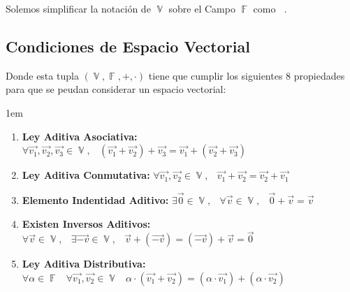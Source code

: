\documentclass[12pt, fleqn]{report}                             %
\newenvironment{SmallIndentation}[1][0.75em]                    %
        {\begin{adjustwidth}{#1}{}\begin{footnotesize}}             %
        {\end{footnotesize}\end{adjustwidth}}                       %
\DeclareMathOperator \Space {\quad}                             %
\DeclareMathOperator \MiniSpace {\;}                            %
\theoremstyle{break}                                            %
\DeclareMathOperator \GenericField {\mathbb{F}}                 %
\DeclareMathOperator \VectorSet    {\mathbb{V}}                 %
\DeclareMathOperator \VectorSpace  {\VectorSet_{\GenericField}} %
\begin{document}
            Solemos simplificar la notación de $\VectorSet$ sobre el Campo $\GenericField$ como $\VectorSpace$.


            \subsection{Condiciones de Espacio Vectorial}

                Donde esta tupla $(\VectorSet, \GenericField, +, \cdot)$ tiene que cumplir los siguientes 8
                propiedades para que se peudan considerar un espacio vectorial:

                \begin{SmallIndentation}[1em]

                    \begin{enumerate}
                    
                        \item 
                            \textbf{Ley Aditiva Asociativa:}
                            $\forall \vec{v_1}, \vec{v_2}, \vec{v_3} \in \VectorSet, \MiniSpace
                                (\vec{v_1} + \vec{v_2}) + \vec{v_3} = \vec{v_1} + (\vec{v_2} + \vec{v_3})$

                        \item 
                            \textbf{Ley Aditiva Conmutativa:}
                            $\forall \vec{v_1}, \vec{v_2} \in \VectorSet, \MiniSpace
                                    \vec{v_1} + \vec{v_2} = \vec{v_2} + \vec{v_1}$

                        \item 
                            \textbf{Elemento Indentidad Aditivo:}
                            $\exists \vec{0} \in \VectorSet, \MiniSpace
                                \forall \vec{v} \in \VectorSet, \MiniSpace \vec{0} + \vec{v} = \vec{v}$

                        \item 
                            \textbf{Existen Inversos Aditivos:}
                            $\forall \vec{v} \in \VectorSet, \MiniSpace
                                    \exists \vec{-v} \in \VectorSet, \MiniSpace
                                        \vec{v} + (\vec{-v}) = (\vec{-v}) + \vec{v} = \vec{0}$

                        \item 
                            \textbf{Ley Aditiva Distributiva:}
                            $\forall \alpha \in \GenericField \MiniSpace
                                \forall \vec{v_1}, \vec{v_2} \in \VectorSet \MiniSpace
                                    \alpha \cdot (\vec{v_1} + \vec{v_2}) = 
                                        (\alpha \cdot \vec{v_1}) + (\alpha \cdot \vec{v_2})$


\end{enumerate}
\end{SmallIndentation}
\end{document}
